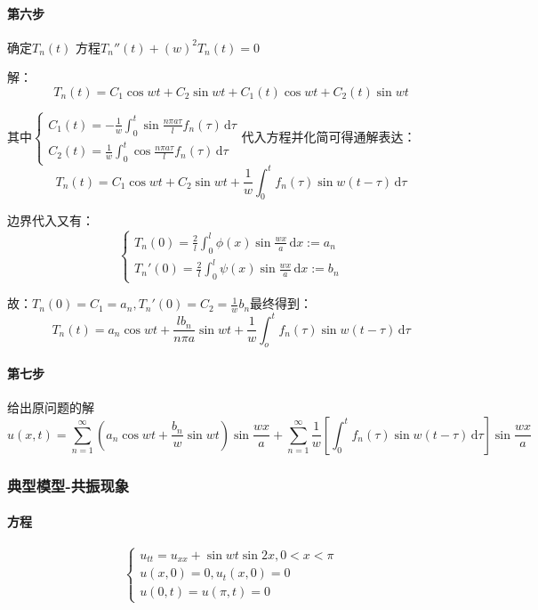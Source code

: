\paragraph{第六步}确定\(T_n(t)\)
方程\(T_n''(t)+\left( w\right)^2T_n(t)=0\)

解：
\[
T_n(t)=C_1\cos{w t}+C_2\sin{w t}+C_1(t)\cos{w t}+C_2(t)\sin{w t}
\]

其中\(\begin{cases}C_1(t)=-\frac{1}{w}\int_{0}^{t}\sin{\frac{n\pi a\tau}{l}f_n(\tau)}\,\mathrm{d}\tau\\C_2(t)=\frac{1}{w}\int_{0}^{t}\cos{\frac{n\pi a\tau}{l}f_n(\tau)}\,\mathrm{d}\tau\end{cases}\)代入方程并化简可得通解表达：
\[
T_n(t)=C_1\cos{w t}+C_2\sin{w t}+\frac{1}{w}\int_{0}^{t}{f_n(\tau)\sin{w(t-\tau)\,\mathrm{d}\tau}}
\]

边界代入又有：
\[\begin{cases}
T_n(0)=\frac{2}{l}\int_{0}^{l}\phi(x)\sin{\frac{wx}{a}\,\mathrm{d}x}:=a_n\\T_n'(0)=\frac{2}{l}\int_{0}^{l}\psi(x)\sin{\frac{wx}{a}\,\mathrm{d}x}:=b_n
\end{cases}\]

故：\(T_n(0)=C_1=a_n,T_n'(0)=C_2=\frac{1}{w}b_n\)最终得到：
\[
T_n(t)=a_n\cos{w t}+\frac{{lb}_n}{n\pi a}\sin{w t}+\frac{1}{w}\int_{o}^{t}{f_n(\tau)\sin{w(t-\tau)}\,\mathrm{d}\tau}
\]

\paragraph{第七步}给出原问题的解
\[
u(x,t)=\sum_{n=1}^{\infty}{\left(a_n\cos{w t}+\frac{b_n}{w}\sin{w t}\right)\sin{\frac{wx}{a}}}+\sum_{n=1}^{\infty}{\frac{1}{w}\left[\int_{0}^{t}{f_n(\tau)\sin{w(t-\tau)}\,\mathrm{d}\tau}\right]\sin\frac{wx}{a}}
\]

\subsubsection{典型模型-共振现象}

\paragraph{方程}
\[\begin{cases}
u_{tt}=u_{xx}+\sin w t\sin2x,0<x<\pi\\
u(x,0)=0,u_t(x,0)=0\\
u(0,t)=u(\pi,t)=0
\end{cases}\]

